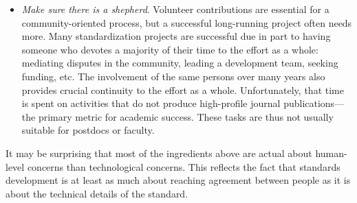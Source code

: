 \begin{itemize}
\item \emph{Make sure there is a shepherd}. Volunteer contributions are essential for a community-oriented process, but a successful long-running project often needs more.  Many standardization projects are successful due in part to having someone who devotes a majority of their time to the effort as a whole: mediating disputes in the community, leading a development team, seeking funding, etc.  The involvement of the same persons over many years also provides crucial continuity to the effort as a whole.  Unfortunately, that time is spent on activities that do not produce high-profile journal publications---the primary metric for academic success.  These tasks are thus not usually suitable for postdocs or faculty.

\end{itemize}
\vspace*{-1em}

It may be surprising that most of the ingredients above are actual about human-level concerns than technological concerns.  This reflects the fact that standards development is at least as much about reaching agreement between people as it is about the technical details of the standard.

